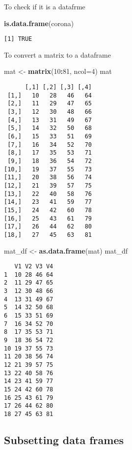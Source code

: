 \documentclass[
]{book}
\newenvironment{Shaded}{\begin{snugshade}}{\end{snugshade}}
\newcommand{\DataTypeTok}[1]{\textcolor[rgb]{0.13,0.29,0.53}{#1}}
\newcommand{\DecValTok}[1]{\textcolor[rgb]{0.00,0.00,0.81}{#1}}
\newcommand{\KeywordTok}[1]{\textcolor[rgb]{0.13,0.29,0.53}{\textbf{#1}}}
\newcommand{\NormalTok}[1]{#1}
\newcommand{\OperatorTok}[1]{\textcolor[rgb]{0.81,0.36,0.00}{\textbf{#1}}}
\newcommand{\StringTok}[1]{\textcolor[rgb]{0.31,0.60,0.02}{#1}}
\begin{document}
To check if it is a datafrme

\begin{Shaded}
\begin{Highlighting}[]
\KeywordTok{is.data.frame}\NormalTok{(corona)}
\end{Highlighting}
\end{Shaded}

\begin{verbatim}
[1] TRUE
\end{verbatim}

To convert a matrix to a dataframe

\begin{Shaded}
\begin{Highlighting}[]
\NormalTok{mat <-}\StringTok{ }\KeywordTok{matrix}\NormalTok{(}\DecValTok{10}\OperatorTok{:}\DecValTok{81}\NormalTok{, }\DataTypeTok{ncol=}\DecValTok{4}\NormalTok{)}
\NormalTok{mat}
\end{Highlighting}
\end{Shaded}

\begin{verbatim}
      [,1] [,2] [,3] [,4]
 [1,]   10   28   46   64
 [2,]   11   29   47   65
 [3,]   12   30   48   66
 [4,]   13   31   49   67
 [5,]   14   32   50   68
 [6,]   15   33   51   69
 [7,]   16   34   52   70
 [8,]   17   35   53   71
 [9,]   18   36   54   72
[10,]   19   37   55   73
[11,]   20   38   56   74
[12,]   21   39   57   75
[13,]   22   40   58   76
[14,]   23   41   59   77
[15,]   24   42   60   78
[16,]   25   43   61   79
[17,]   26   44   62   80
[18,]   27   45   63   81
\end{verbatim}

\begin{Shaded}
\begin{Highlighting}[]
\NormalTok{mat_df <-}\StringTok{ }\KeywordTok{as.data.frame}\NormalTok{(mat)}
\NormalTok{mat_df}
\end{Highlighting}
\end{Shaded}

\begin{verbatim}
   V1 V2 V3 V4
1  10 28 46 64
2  11 29 47 65
3  12 30 48 66
4  13 31 49 67
5  14 32 50 68
6  15 33 51 69
7  16 34 52 70
8  17 35 53 71
9  18 36 54 72
10 19 37 55 73
11 20 38 56 74
12 21 39 57 75
13 22 40 58 76
14 23 41 59 77
15 24 42 60 78
16 25 43 61 79
17 26 44 62 80
18 27 45 63 81
\end{verbatim}

\hypertarget{subsetting-data-frames}{%
\subsection{Subsetting data frames}\label{subsetting-data-frames}}
\end{document}
